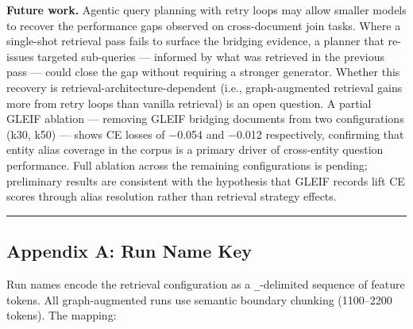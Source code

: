 \textbf{Future work.} Agentic query planning with retry loops may allow smaller models to recover the performance gaps observed on cross-document join tasks. Where a single-shot retrieval pass fails to surface the bridging evidence, a planner that re-issues targeted sub-queries --- informed by what was retrieved in the previous pass --- could close the gap without requiring a stronger generator. Whether this recovery is retrieval-architecture-dependent (i.e., graph-augmented retrieval gains more from retry loops than vanilla retrieval) is an open question. A partial GLEIF ablation --- removing GLEIF bridging documents from two configurations (k30, k50) --- shows CE losses of −0.054 and −0.012 respectively, confirming that entity alias coverage in the corpus is a primary driver of cross-entity question performance. Full ablation across the remaining configurations is pending; preliminary results are consistent with the hypothesis that GLEIF records lift CE scores through alias resolution rather than retrieval strategy effects.

\begin{center}\rule{0.5\linewidth}{0.5pt}\end{center}

\subsection{Appendix A: Run Name Key}\label{appendix-a-run-name-key}

Run names encode the retrieval configuration as a \texttt{\_}-delimited sequence of feature tokens. All graph-augmented runs use semantic boundary chunking (1100--2200 tokens). The mapping:

